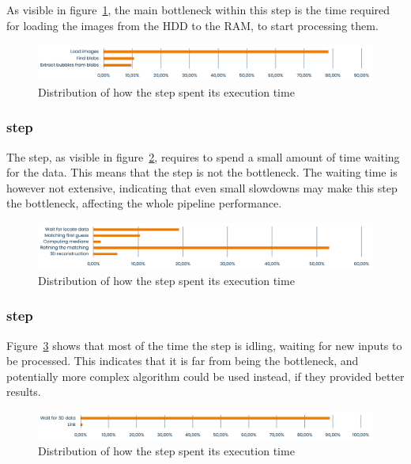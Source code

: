 As visible in figure~\ref{fig:speed:locate}, the main bottleneck within this step is the time required for loading the images from the HDD to the RAM, to start processing them.

\begin{figure}
	\centerline{\includegraphics[width=\textwidth]{images/speed/locate.png}}
	\caption{\centering Distribution of how the \locate* step spent its execution time}
	\label{fig:speed:locate}
\end{figure}

\subsubsection{\match* step}

The \match* step, as visible in figure~\ref{fig:speed:match}, requires to spend a small amount of time waiting for the \locate* data.
This means that the \match* step is not the bottleneck.
The waiting time is however not extensive, indicating that even small slowdowns may make this step the bottleneck, affecting the whole pipeline performance.

\begin{figure}
	\centerline{\includegraphics[width=\textwidth]{images/speed/matching.png}}
	\caption{\centering Distribution of how the \match* step spent its execution time}
	\label{fig:speed:match}
\end{figure}

\subsubsection{\link* step}

Figure~\ref{fig:speed:link} shows that most of the time the \link* step is idling, waiting for new inputs to be processed.
This indicates that it is far from being the bottleneck, and potentially more complex algorithm could be used instead, if they provided better results.

\begin{figure}[H]
	\centerline{\includegraphics[width=\textwidth]{images/speed/link.png}}
	\caption{\centering Distribution of how the \link* step spent its execution time}
	\label{fig:speed:link}
\end{figure}

